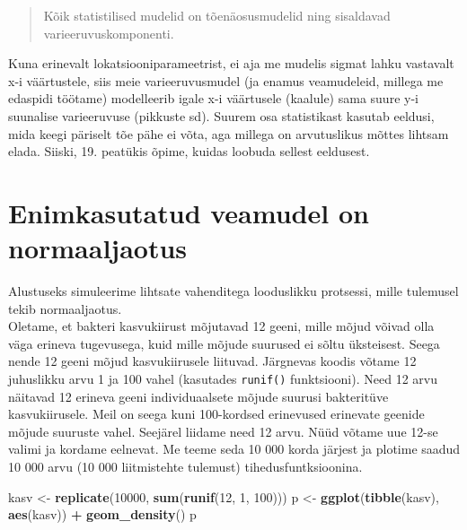 \documentclass[]{book}
\newenvironment{Shaded}{\begin{snugshade}}{\end{snugshade}}
\newcommand{\DecValTok}[1]{\textcolor[rgb]{0.00,0.00,0.81}{#1}}
\newcommand{\KeywordTok}[1]{\textcolor[rgb]{0.13,0.29,0.53}{\textbf{#1}}}
\newcommand{\NormalTok}[1]{#1}
\newcommand{\OperatorTok}[1]{\textcolor[rgb]{0.81,0.36,0.00}{\textbf{#1}}}
\newcommand{\StringTok}[1]{\textcolor[rgb]{0.31,0.60,0.02}{#1}}
\begin{document}
\begin{quote}
Kõik statistilised mudelid on tõenäosusmudelid ning sisaldavad varieeruvuskomponenti.
\end{quote}

Kuna erinevalt lokatsiooniparameetrist, ei aja me mudelis sigmat lahku vastavalt x-i väärtustele, siis meie varieeruvusmudel (ja enamus veamudeleid, millega me edaspidi töötame) modelleerib igale x-i väärtusele (kaalule) sama suure y-i suunalise varieeruvuse (pikkuste sd).
Suurem osa statistikast kasutab eeldusi, mida keegi päriselt tõe pähe ei võta, aga millega on arvutuslikus mõttes lihtsam elada. Siiski, 19. peatükis õpime, kuidas loobuda sellest eeldusest.

\hypertarget{enimkasutatud-veamudel-on-normaaljaotus}{%
\section*{Enimkasutatud veamudel on normaaljaotus}\label{enimkasutatud-veamudel-on-normaaljaotus}}

Alustuseks simuleerime lihtsate vahenditega looduslikku protsessi, mille tulemusel tekib normaaljaotus.\\
Oletame, et bakteri kasvukiirust mõjutavad 12 geeni, mille mõjud võivad olla väga erineva tugevusega, kuid mille mõjude suurused ei sõltu üksteisest.
Seega nende 12 geeni mõjud kasvukiirusele liituvad.
Järgnevas koodis võtame 12 juhuslikku arvu 1 ja 100 vahel (kasutades \texttt{runif()} funktsiooni).
Need 12 arvu näitavad 12 erineva geeni individuaalsete mõjude suurusi bakteritüve kasvukiirusele.
Meil on seega kuni 100-kordsed erinevused erinevate geenide mõjude suuruste vahel.
Seejärel liidame need 12 arvu.
Nüüd võtame uue 12-se valimi ja kordame eelnevat.
Me teeme seda 10 000 korda järjest ja plotime saadud 10 000 arvu (10 000 liitmistehte tulemust) tihedusfuntksioonina.



\begin{Shaded}
\begin{Highlighting}[]
\NormalTok{kasv <-}\StringTok{ }\KeywordTok{replicate}\NormalTok{(}\DecValTok{10000}\NormalTok{, }\KeywordTok{sum}\NormalTok{(}\KeywordTok{runif}\NormalTok{(}\DecValTok{12}\NormalTok{, }\DecValTok{1}\NormalTok{, }\DecValTok{100}\NormalTok{))) }
\NormalTok{p <-}\StringTok{ }\KeywordTok{ggplot}\NormalTok{(}\KeywordTok{tibble}\NormalTok{(kasv), }\KeywordTok{aes}\NormalTok{(kasv)) }\OperatorTok{+}\StringTok{ }\KeywordTok{geom_density}\NormalTok{()}
\NormalTok{p}
\end{Highlighting}
\end{Shaded}
\end{document}

